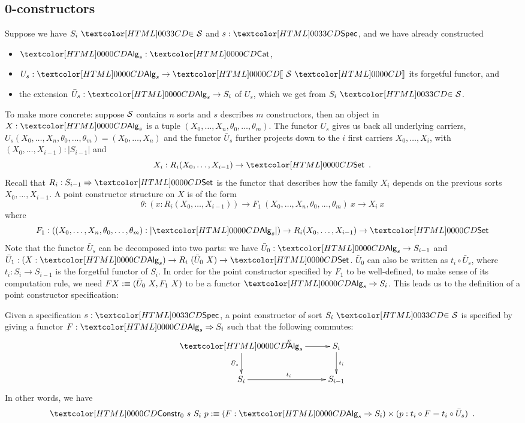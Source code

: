 \subsection{0-constructors}

Suppose we have $\sortsin{S_i}{\Ss}$ and $s : \specty$, and we have already
constructed
%
\begin{itemize}
\item $\Alg_s : \Cat$,
\item $U_s : \Alg_s \to \SortCat{\Ss}$ its forgetful functor, and
\item the extension $\bar{U}_s : \Alg_s \to S_i$ of $U_s$, which we
  get from $\sortsin{S_i}{\Ss}$.
\end{itemize}
%
To make more concrete: suppose $\mathcal{S}$ contains $n$ sorts and $s$
describes $m$ constructors, then an object in $X : \Alg_s$ is a tuple
$(X_0, \hdots, X_n, \theta_0, \hdots, \theta_m)$. The functor $U_s$
gives us back all underlying carriers, \ie
$U_s(X_0, \hdots, X_n, \theta_0, \hdots, \theta_m) = (X_0, \hdots,
X_n)$
and the functor $\bar{U}_s$ further projects down to the $i$ first
carriers $X_0, \hdots, X_i$, with
$(X_0, \hdots, X_{i-1}) : | S_{i-1} |$ and
\[
X_i : R_i (X_0, \hdots, X_{i-1}) \to \Set \enspace .
\]
Recall that $R_i : \Func{S_{i-1}}{\Set}$ is the functor that describes how
the family $X_i$ depends on the previous sorts $X_0, \hdots,
X_{i-1}$. A point constructor structure on $X$ is of the form
$$
\theta : (x : R_i (X_0, \hdots, X_{i-1})) \to F_1\ (X_0, \hdots, X_n, \theta_0, \hdots, \theta_m)\ x \to X_i\ x
$$
where
$$
F_1 : ((X_0,\hdots,X_n,\theta_0,\hdots,\theta_m) : | \Alg_s |) \to R_i (X_0, \hdots, X_{i-1}) \to \Set
$$
Note that the functor $\bar{U}_s$ can be decomposed into two parts: we
have $\bar{U}_0 : \Alg_s \to S_{i-1}$ and
$\bar{U}_1 : (X : \Alg_s) \to R_i\ (\bar{U}_0\ X) \to \Set$.
$\bar{U}_0$ can also be written as $t_i \circ \bar{U}_s$, where
$t_i : S_i \to S_{i-1}$ is the forgetful functor of $S_i$. In order
for the point constructor specified by $F_1$ to be well-defined, \ie
to make sense of its computation rule, we need
$F X :\equiv (\bar{U}_0\ X, F_1\ X)$ to be a functor
$\Func{\Alg_s}{S_i}$.  This leads us to the definition of a point
constructor specification:

\begin{definition}
  Given a specification $s : \specty$, a point constructor of sort
  $\sortsin{S_i}{\Ss}$ is specified by giving a functor
  $F : \Func{\Alg_s}{S_i}$ such that the following commutes:
  $$
  \xymatrix{
    \Alg_s \ar[r]^{F} \ar[d]_{\bar{U}_s} &S_i \ar[d]^{t_i} \\
    S_i \ar[r]^{t_i} &S_{i-1}
  }
  $$
  In other words, we have
  $$
  \Constr_0\ s\ S_i\ p \ddefeq (F : \Func{\Alg_s}{S_i}) \times (p : t_i \circ F = t_i \circ \bar{U}_s) \enspace .
  $$
\end{definition} 

